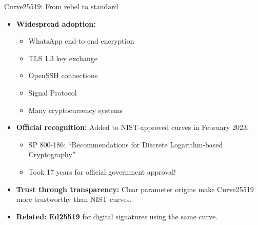 \documentclass[aspectratio=169, lualatex, handout]{beamer}
\begin{document}
\begin{frame}{Curve25519: From rebel to standard}
	\begin{itemize}[<+->]
		\item \textbf{Widespread adoption:}
		      \begin{itemize}
			      \item WhatsApp end-to-end encryption
			      \item TLS 1.3 key exchange
			      \item OpenSSH connections
			      \item Signal Protocol
			      \item Many cryptocurrency systems
		      \end{itemize}
		\item \textbf{Official recognition:} Added to NIST-approved curves in February 2023.
		      \begin{itemize}
			      \item SP 800-186: ``Recommendations for Discrete Logarithm-based Cryptography''
			      \item Took 17 years for official government approval!
		      \end{itemize}
		\item \textbf{Trust through transparency:} Clear parameter origins make Curve25519 more trustworthy than NIST curves.
		\item \textbf{Related: Ed25519} for digital signatures using the same curve.
	\end{itemize}
\end{frame}
\end{document}
